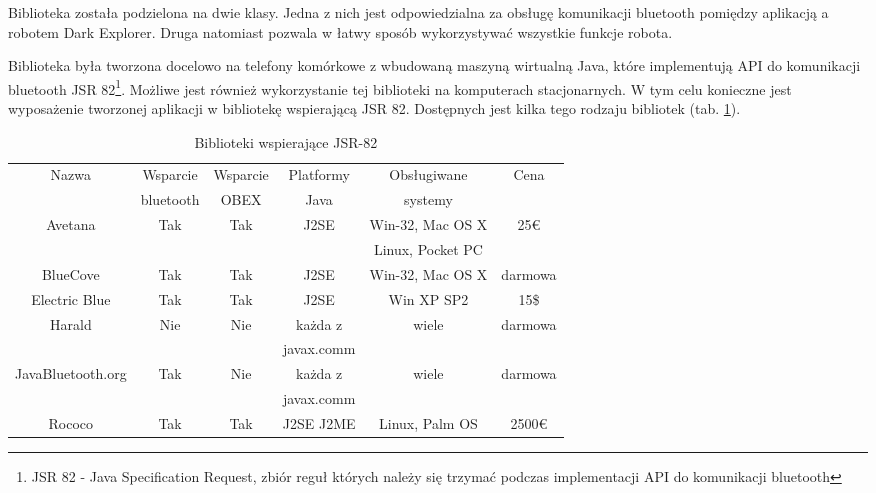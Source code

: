 Biblioteka została podzielona na dwie klasy. Jedna z nich jest odpowiedzialna za
obsługę komunikacji bluetooth pomiędzy aplikacją a robotem Dark Explorer. Druga
natomiast pozwala w łatwy sposób wykorzystywać wszystkie funkcje robota.

Biblioteka była tworzona docelowo na telefony komórkowe z wbudowaną maszyną
wirtualną Java, które implementują API do komunikacji bluetooth JSR
82\footnote{JSR 82 - Java Specification Request, zbiór reguł których należy się
trzymać podczas implementacji API do komunikacji bluetooth}. Możliwe jest również
wykorzystanie tej biblioteki na komputerach stacjonarnych. W tym celu konieczne
jest wyposażenie tworzonej aplikacji w bibliotekę wspierającą JSR 82. Dostępnych
jest kilka tego rodzaju bibliotek (tab. \ref{tab:JSR82SDK}).

\begin{table}[hb]
  \centering
  \caption{Biblioteki wspierające JSR-82\cite{website:javabluetooth.com}}
  \begin{tabular}{ | c | c | c | c | c | c |} \hline
    Nazwa & Wsparcie & Wsparcie & Platformy & Obsługiwane & Cena \\
    & bluetooth\footnotemark & OBEX\footnotemark & Java & systemy & \\ \hline Avetana & Tak & Tak &
    J2SE & Win-32, Mac OS X & 25\euro \\ & & & & Linux, Pocket PC & \\ \hline BlueCove & Tak & Tak & J2SE & Win-32, Mac OS X & darmowa \\ \hline
    Electric Blue & Tak & Tak & J2SE & Win XP SP2 & 15\$ \\ \hline
    Harald & Nie & Nie & każda z  & wiele & darmowa \\
    & & & javax.comm  &  & \\ \hline
    JavaBluetooth.org & Tak & Nie & każda z  & wiele & darmowa \\
    & & & javax.comm  &  & \\ \hline
    Rococo & Tak & Tak & J2SE J2ME & Linux, Palm OS & 2500\euro \\ \hline
  \end{tabular}
  \label{tab:JSR82SDK}
\end{table} 


